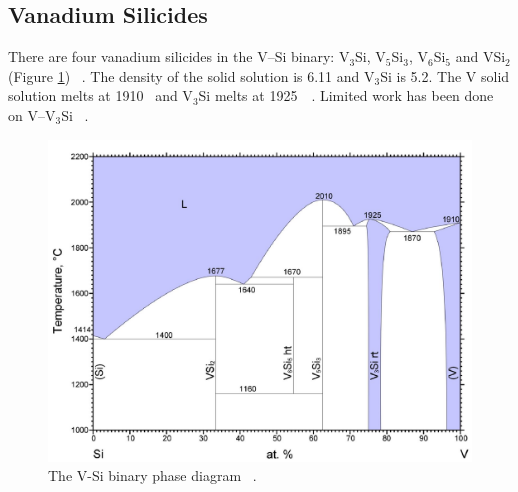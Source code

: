 \subsection{Vanadium Silicides}
There are four vanadium silicides in the V--Si binary: V$_3$Si, V$_5$Si$_3$, V$_6$Si$_5$ and VSi$_2$ (Figure \ref{fig:VSi}) ~\cite{smith90}. The density of the solid solution is 6.11 \gram\usk\centi\rpcubic\meter and V$_3$Si is 5.2\gram\usk\centi\rpcubic\meter. The V solid solution melts at 1910 \celsius\  and V$_3$Si melts at 1925\celsius\ ~\cite{freund78}. Limited work has been done on V--V$_3$Si ~\cite{strum93}.
%
\begin{figure}[H]
\begin{center}
\includegraphics[width=.8\textwidth]{VSi}
\caption{The V-Si binary phase diagram ~\cite{smith90}.}
\label{fig:VSi}
\end{center}
\end{figure}
%

